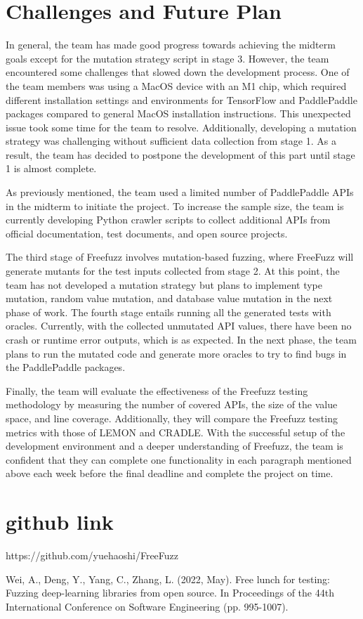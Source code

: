 \documentclass[sigconf]{acmart}
\begin{document}
\section{Challenges and Future Plan}
In general, the team has made good progress towards achieving the midterm goals except for the mutation strategy script in stage 3. However, the team encountered some challenges that slowed down the development process. One of the team members was using a MacOS device with an M1 chip, which required different installation settings and environments for TensorFlow and PaddlePaddle packages compared to general MacOS installation instructions. This unexpected issue took some time for the team to resolve. Additionally, developing a mutation strategy was challenging without sufficient data collection from stage 1. As a result, the team has decided to postpone the development of this part until stage 1 is almost complete.
\par As previously mentioned, the team used a limited number of PaddlePaddle APIs in the midterm to initiate the project. To increase the sample size, the team is currently developing Python crawler scripts to collect additional APIs from official documentation, test documents, and open source projects.
\par The third stage of Freefuzz involves mutation-based fuzzing, where FreeFuzz will generate mutants for the test inputs collected from stage 2. At this point, the team has not developed a mutation strategy but plans to implement type mutation, random value mutation, and database value mutation in the next phase of work. The fourth stage entails running all the generated tests with oracles. Currently, with the collected unmutated API values, there have been no crash or runtime error outputs, which is as expected. In the next phase, the team plans to run the mutated code and generate more oracles to try to find bugs in the PaddlePaddle packages.
\par Finally, the team will evaluate the effectiveness of the Freefuzz testing methodology by measuring the number of covered APIs, the size of the value space, and line coverage. Additionally, they will compare the Freefuzz testing metrics with those of LEMON and CRADLE.
With the successful setup of the development environment and a deeper understanding of Freefuzz, the team is confident that they can complete one functionality in each paragraph mentioned above each week before the final deadline and complete the project on time.

\section{github link}
https://github.com/yuehaoshi/FreeFuzz
\begin{thebibliography}{9}
 Wei, A., Deng, Y., Yang, C.,  Zhang, L. (2022, May). Free lunch for testing: Fuzzing deep-learning libraries from open source. In Proceedings of the 44th International Conference on Software Engineering (pp. 995-1007).
\end{thebibliography}
\end{document}
